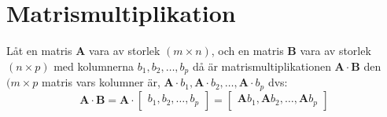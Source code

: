 \section{Matrismultiplikation} %
\label{sec:matrismultiplikation}
\begin{Def}
    Låt en matris \textbf{A} vara av storlek $(m \times n)$, och en matris \textbf{B} vara av storlek $(n \times p)$ med kolumnerna $b_1,b_2, \dots ,b_p$ då är matrismultiplikationen $\mathbf{A} \cdot \mathbf{B}$ den $(m \times p$ matris vars kolumner är, $\mathbf{A} \cdot b_1, \mathbf{A} \cdot b_2, \dots, \mathbf{A} \cdot b_p$ dvs:
    \[
        \mathbf{A} \cdot \mathbf{B} = \mathbf{A} \cdot \begin{bmatrix} b_1,b_2, \dots, b_p \end{bmatrix} = \begin{bmatrix} \mathbf{A}b_1,\mathbf{A}b_2, \dots, \mathbf{A}b_p \end{bmatrix}
    \]
\end{Def}
\newpage
